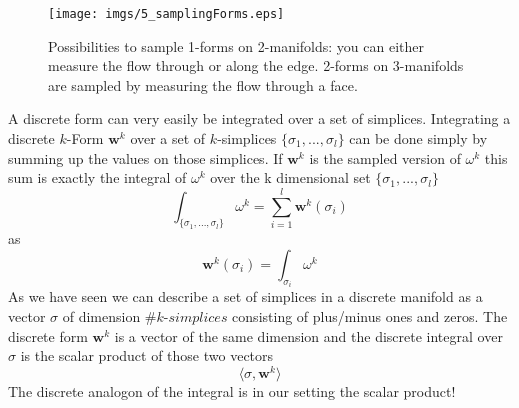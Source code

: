 \begin{figure}%
\texttt{[image: imgs/5\_samplingForms.eps]}%
\caption{Possibilities to sample 1-forms on 2-manifolds: you can either measure the flow through or along the edge. 2-forms on 3-manifolds are sampled by measuring the flow through a face.}%
\label{fig:5_samplingForms}%
\end{figure}
A discrete form can very easily be integrated over a set of simplices. Integrating a discrete $k$-Form $\textbf{w}^k$ over a set of $k$-simplices $\{\sigma_1,...,\sigma_l\}$ can be done simply by summing up the values on those simplices. If $\textbf{w}^k$ is the sampled version of $\omega^k$ this sum is exactly the integral of $\omega^k$  over the k dimensional set $\{\sigma_1,...,\sigma_l\}$
\[\int_{\{\sigma_1,...,\sigma_l\}} \omega^k = \sum_{i=1}^l \textbf{w}^k(\sigma_i)\]
as
\[\textbf{w}^k(\sigma_i) = \int_{\sigma_i} \omega^k\]
As we have seen we can describe a set of simplices in a discrete manifold as a vector $\sigma$ of dimension $\# k$-$simplices$ consisting of plus/minus ones and zeros. The discrete form $\textbf{w}^k$ is a vector of the same dimension and the discrete integral over $\sigma$ is the scalar product of those two vectors
$$\langle \sigma , \textbf{w}^k \rangle$$
The discrete analogon of the integral is in our setting the scalar product!
